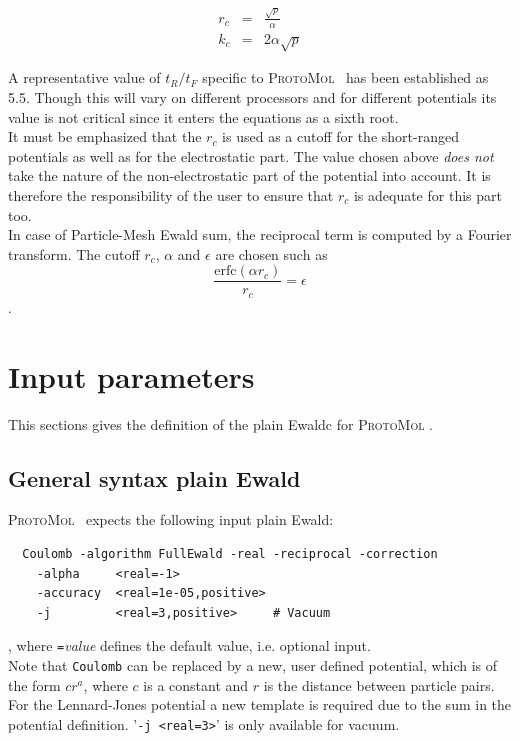 \documentclass[11pt]{article}
\newcommand{\ProtoMol}{\textsc{ProtoMol }}
\newcommand{\erfc}{\mbox{erfc}}
\begin{document}
\begin{eqnarray}
r_c  &=& \frac{\sqrt{p}}{\alpha} \\
k_c &=& 2 \alpha \sqrt{p}
\end{eqnarray}

A representative value of $t_R/t_F$ specific to \ProtoMol\ has been
established as 5.5.  Though this will vary on different processors
and for different potentials its value is not critical since it
enters the equations as a sixth root. \\
It must be emphasized that the $r_c$ is used as a cutoff for the
short-ranged potentials as well as for the electrostatic part.  The
value chosen above \emph{does not} take the nature of the
non-electrostatic part of the potential into account.  It is therefore
the responsibility of the user to ensure that $r_c$ is adequate for
this part too.\\

In case of Particle-Mesh Ewald sum, the reciprocal term is computed by
a Fourier transform. The cutoff $r_c$, $\alpha$ and $\epsilon$ are
chosen such as
\begin{equation}
  \frac {\erfc (\alpha r_c)}{r_c}= \epsilon 
\label{eq:pme-alpha}
\end{equation}.


\section{Input parameters}

This sections gives the definition of the plain Ewaldc for \ProtoMol. 

\subsection{General syntax plain Ewald}

\ProtoMol\  expects the following input plain Ewald:
\small
\begin{verbatim}
  Coulomb -algorithm FullEwald -real -reciprocal -correction
    -alpha     <real=-1>	
    -accuracy  <real=1e-05,positive>
    -j         <real=3,positive>     # Vacuum
 \end{verbatim}
\normalsize
, where \texttt{=}{\it value} defines the default value, i.e. optional
input.\\
Note that \texttt{Coulomb} can be replaced by a new, user defined potential,
which is of the form $c r^a$, where $c$ is a constant and $r$ is the
distance between particle pairs. For the Lennard-Jones potential a new
template is required due to the sum in the potential definition.
'\texttt{-j <real=3>}' is only available for vacuum.
\end{document}
